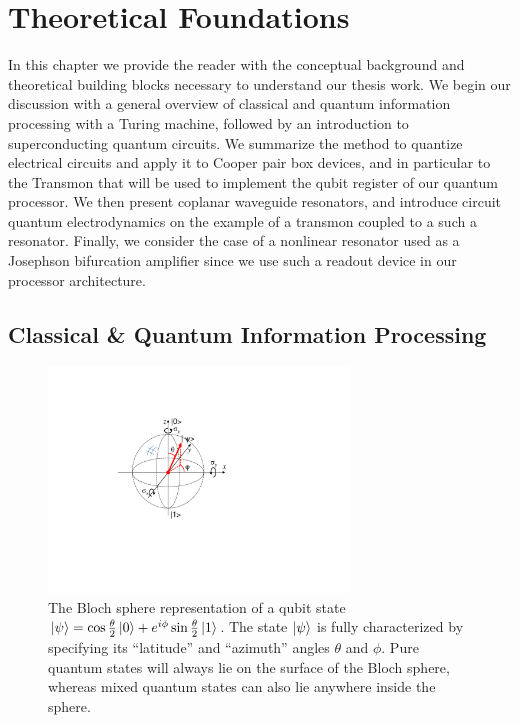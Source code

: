 \chapter{Theoretical Foundations} \label{chapter:theory}

In this chapter we provide the reader with the conceptual background and theoretical building blocks necessary  to understand our thesis work. We begin our discussion with a general overview of classical and quantum information processing with a Turing machine, followed by an introduction to superconducting quantum circuits. We summarize the method to quantize electrical circuits and apply it to Cooper pair box devices, and in particular to the Transmon that will be used to implement the qubit register of our quantum processor. We then present coplanar waveguide resonators, and introduce circuit quantum electrodynamics on the example of a transmon coupled to a such a resonator. Finally, we consider the case of a nonlinear resonator used as a Josephson bifurcation amplifier since we use such a readout device in our processor architecture.

\section{Classical \& Quantum Information Processing}

\begin{figure}
	\includegraphics[width=8cm]{"./material/figures/introduction/bloch_sphere"}
	\caption{The Bloch sphere representation of a qubit state $\left| \psi \right> = \cos{\frac{\theta}{2}}\left| 0 \right>+e^{i\phi}\sin{\frac{\theta}{2}}\left| 1 \right>$. The state $\left| \psi \right>$ is fully characterized by specifying its ``latitude'' and ``azimuth'' angles $\theta$ and $\phi$. Pure quantum states will always lie on the surface of the Bloch sphere, whereas mixed quantum states can also lie anywhere inside the sphere.}
	\label{fig:BlochSphere}
\end{figure}


